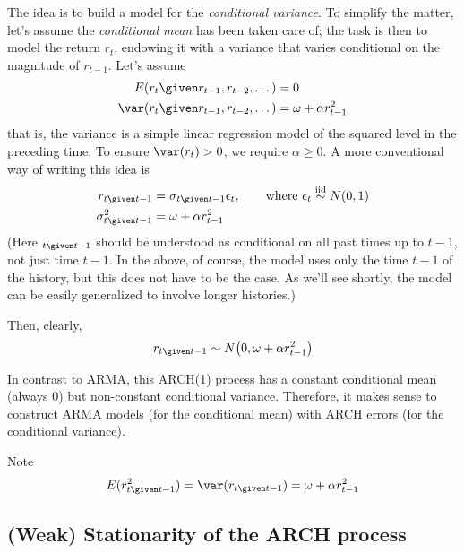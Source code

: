 \documentclass[12pt]{article}
\begin{document}
The idea is to build a model for the \emph{conditional variance}.
To simplify the matter,
let's assume the \emph{conditional mean} has been taken care of;
the task is then to model the return $r_t$, endowing it with
a variance that varies conditional on the magnitude of $r_{t-1}$.
Let's assume
\begin{align*}
E(r_t \given r_{t-1}, r_{t-2},\dotsc) &= 0\\
\var(r_t \given r_{t-1}, r_{t-2}, \dotsc) &= \omega + \alpha r_{t-1}^2
\end{align*}
that is, the variance is a simple linear regression model
of the squared level in the preceding time.
To ensure $\var(r_t) > 0$,
we require $\alpha \ge 0$.
A more conventional way of writing this idea is
\begin{equation}\label{eq:ARCH-1}
\begin{split}
r_{t\given t-1} &= \sigma_{t\given t-1} \epsilon_t,
    \qquad\text{where
        $\epsilon_t \overset{\text{iid}}{\sim} N(0, 1)$}
    \\
\sigma^2_{t\given t-1} &= \omega + \alpha r_{t-1}^2
\end{split}
\end{equation}
(Here $_{t\given t-1}$ should be understood
as conditional on all past times up to $t-1$,
not just time $t-1$.
In the above, of course,
the model uses only the time $t-1$ of the history,
but this does not have to be the case.
As we'll see shortly, the model can be easily generalized
to involve longer histories.)

Then, clearly,
\begin{equation}\label{eq:ARCH-2}
r_{t \given t-1} \sim N\bigl(0, \omega + \alpha r_{t-1}^2\bigr)
\end{equation}

In contrast to ARMA,
this ARCH(1) process has a constant conditional mean
(always 0) but non-constant conditional variance.
Therefore, it makes sense to construct
ARMA models (for the conditional mean) with ARCH errors
(for the conditional variance).

Note
\[
E(r^2_{t\given t-1})
= \var(r_{t\given t-1})
= \omega + \alpha r_{t-1}^2
\]

\subsection{(Weak) Stationarity of the ARCH process}
\end{document}
